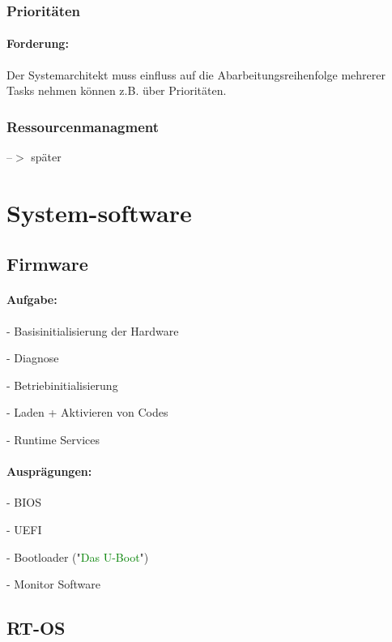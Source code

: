 \documentclass[12pt,a4paper,oneside,ngerman]{article}
\begin{document}
\subsubsection{Prioritäten}
\paragraph{Forderung:}
Der Systemarchitekt muss einfluss auf die Abarbeitungsreihenfolge mehrerer Tasks nehmen können z.B. über Prioritäten.

\subsubsection{Ressourcenmanagment}
--$>$ später

\section[System-software]{System-software}
\subsection{Firmware}
\paragraph{Aufgabe:}
\begin{description}
	\item - Basisinitialisierung der Hardware
	\item - Diagnose
	\item - Betriebinitialisierung
	\item - Laden + Aktivieren von Codes
	\item - Runtime Services
\end{description}
\paragraph{Ausprägungen:}
\begin{description}
	\item - BIOS
	\item - UEFI
	\item - Bootloader ("\textcolor{green}{Das U-Boot}")
	\item - Monitor Software
\end{description}

\subsection{RT-OS}
\end{document}
